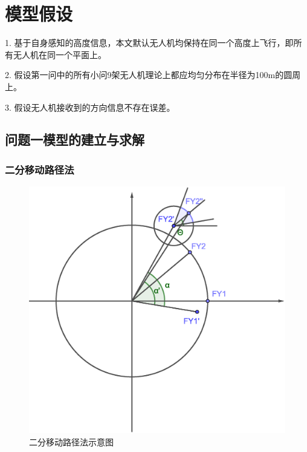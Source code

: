 \documentclass{ctexart}
\begin{document}
\section{模型假设}
1. \quad 基于自身感知的高度信息，本文默认无人机均保持在同一个高度上飞行，即所有无人机在同一个平面上。

2. \quad 假设第一问中的所有小问9架无人机理论上都应均匀分布在半径为100m的圆周上。

3. \quad 假设无人机接收到的方向信息不存在误差。


\subsection{问题一模型的建立与求解}


  \subsubsection{二分移动路径法}

  \begin{figure}[H]
    \centering
    \includegraphics[width=0.45\linewidth]{pic/bisection.eps}
    \caption{二分移动路径法示意图}
    \label{二分移动路径法示意图}
    \end{figure}
\end{document}
